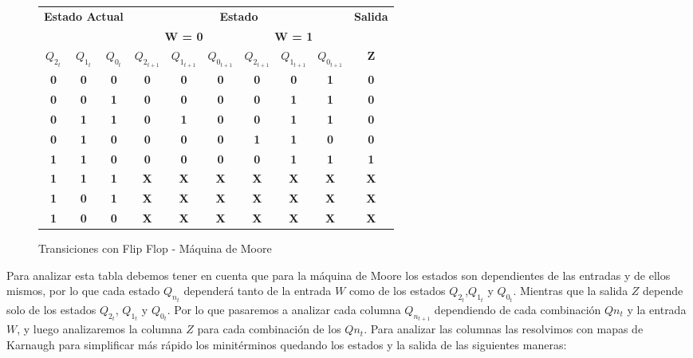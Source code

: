 \documentclass[10pt,a4paper]{article}
\begin{document}
\begin{figure}[H]
	\begin{center}
		\begin{tabular}{|c|c|c|c|c|c|c|c|c|c|}
\hline
\multicolumn{3}{|c|}{\multirow{2}{*}{\textbf{Estado Actual}}} & \multicolumn{6}{c|}{\textbf{Estado}} & \multirow{2}{*}{\textbf{Salida}} \\ \cline{4-9}
\multicolumn{3}{|c|}{} & \multicolumn{3}{c|}{\textbf{W = 0}} & \multicolumn{3}{c|}{\textbf{W = 1}} &  \\ \hline
\textbf{$Q_{2_{t}}$} & \textbf{$Q_{1_{t}}$} & \textbf{$Q_{0_{t}}$} & \textbf{$Q_{2_{t+1}}$} & \textbf{$Q_{1_{t+1}}$} & \textbf{$Q_{0_{t+1}}$} & \textbf{$Q_{2_{t+1}}$} & \textbf{$Q_{1_{t+1}}$} & \textbf{$Q_{0_{t+1}}$} & \textbf{Z} \\ \hline
\textbf{0} & \textbf{0} & \textbf{0} & \textbf{0} & \textbf{0} & \textbf{0} & \textbf{0} & \textbf{0} & \textbf{1} & \textbf{0} \\ \hline
\textbf{0} & \textbf{0} & \textbf{1} & \textbf{0} & \textbf{0} & \textbf{0} & \textbf{0} & \textbf{1} & \textbf{1} & \textbf{0} \\ \hline
\textbf{0} & \textbf{1} & \textbf{1} & \textbf{0} & \textbf{1} & \textbf{0} & \textbf{0} & \textbf{1} & \textbf{1} & \textbf{0} \\ \hline
\textbf{0} & \textbf{1} & \textbf{0} & \textbf{0} & \textbf{0} & \textbf{0} & \textbf{1} & \textbf{1} & \textbf{0} & \textbf{0} \\ \hline
\textbf{1} & \textbf{1} & \textbf{0} & \textbf{0} & \textbf{0} & \textbf{0} & \textbf{0} & \textbf{1} & \textbf{1} & \textbf{1} \\ \hline
\textbf{1} & \textbf{1} & \textbf{1} & \textbf{X} & \textbf{X} & \textbf{X} & \textbf{X} & \textbf{X} & \textbf{X} & \textbf{X} \\ \hline
\textbf{1} & \textbf{0} & \textbf{1} & \textbf{X} & \textbf{X} & \textbf{X} & \textbf{X} & \textbf{X} & \textbf{X} & \textbf{X} \\ \hline
\textbf{1} & \textbf{0} & \textbf{0} & \textbf{X} & \textbf{X} & \textbf{X} & \textbf{X} & \textbf{X} & \textbf{X} & \textbf{X} \\ \hline
		\end{tabular}
		\caption{Transiciones con Flip Flop - Máquina de Moore} 
		\label{2_fig2}
	\end{center}
\end{figure}

Para analizar esta tabla debemos tener en cuenta que para la máquina de Moore los estados son dependientes de las entradas y de ellos mismos, por lo que cada estado $Q_{n_{t}}$ depender\'a tanto de la entrada $W$ como de los estados $Q_{2_{t}}$,$Q_{1_{t}}$ y $Q_{0_{t}}$. Mientras que la salida $Z$ depende solo de los estados $Q_{2_{t}}$, $Q_{1_{t}}$ y $Q_{0_{t}}$. Por lo que pasaremos a analizar cada columna $Q_{n_{t+1}}$ dependiendo de cada combinaci\'on $Q{n_{t}}$ y la entrada $W$, y luego analizaremos la columna $Z$ para cada combinaci\'on de los $Q{n_{t}}$. Para analizar las columnas las resolvimos con mapas de Karnaugh para simplificar más rápido los minit\'erminos quedando los estados y la salida de las siguientes maneras:
	
\end{document}

